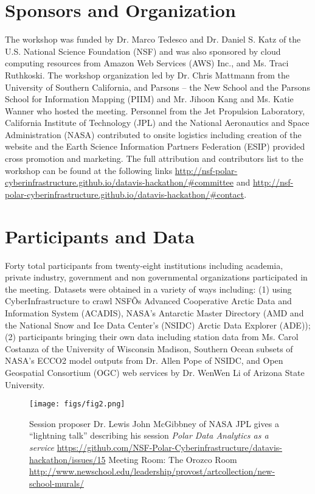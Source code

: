 \documentclass[11pt]{article}
\begin{document}
\section{Sponsors and Organization}
The workshop was funded by Dr. Marco Tedesco and Dr. Daniel S. Katz of the U.S. National Science Foundation (NSF) and was also sponsored by cloud computing resources from Amazon Web Services (AWS) Inc., and Ms. Traci Ruthkoski. The workshop organization led by Dr. Chris Mattmann from the University of Southern California, and Parsons -- the New School and the Parsons School for Information Mapping (PIIM) and Mr. Jihoon Kang and Ms. Katie Wanner who hosted the meeting. Personnel from the Jet Propulsion Laboratory, California Institute of Technology (JPL) and the National Aeronautics and Space Administration (NASA) contributed to onsite logistics including creation of the website and the Earth Science Information Partners Federation (ESIP) provided cross promotion and marketing. The full attribution and contributors list to the workshop can be found at the following links \url{http://nsf-polar-cyberinfrastructure.github.io/datavis-hackathon/#committee} and \url{http://nsf-polar-cyberinfrastructure.github.io/datavis-hackathon/#contact}. 


\section{Participants and Data}
Forty total participants from twenty-eight institutions including academia, private industry, government and non governmental organizations participated in the meeting. Datasets were obtained in a variety of ways including: (1) using CyberInfrastructure to crawl NSFÕs Advanced Cooperative Arctic Data and Information System (ACADIS), NASA's Antarctic Master Directory (AMD and the National Snow and Ice Data Center's (NSIDC) Arctic Data Explorer (ADE));  (2) participants bringing their own data including station data from Ms. Carol Costanza of the University of Wisconsin Madison, Southern Ocean subsets of NASA's ECCO2 model outputs from Dr. Allen Pope of NSIDC, and Open Geospatial Consortium (OGC) web services by Dr. WenWen Li of Arizona State University. 

\begin{figure*}[htp]
    \centering
    \texttt{[image: figs/fig2.png]}
    \caption{Session proposer Dr. Lewis John McGibbney of NASA JPL gives a ``lightning talk'' describing his session {\em Polar Data Analytics as a service} \protect\url{https://github.com/NSF-Polar-Cyberinfrastructure/datavis-hackathon/issues/15} Meeting Room: The Orozco Room \protect\url{http://www.newschool.edu/leadership/provost/artcollection/new-school-murals/}}
    \label{fig:lightning}
\end{figure*}
\end{document}
